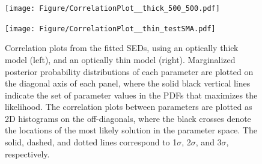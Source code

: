 \documentclass[twocolumn,apj,numberedappendix]{emulateapj}
\begin{document}

\begin{figure}[!tbph]
\centering
\begin{minipage}{0.5\textwidth}
\hspace{-1cm}
\texttt{[image: Figure/CorrelationPlot\_\_thick\_500\_500.pdf]}
\end{minipage}
\hspace{-0.9cm}
\begin{minipage}{0.5\textwidth}
\texttt{[image: Figure/CorrelationPlot\_\_thin\_testSMA.pdf]}
\end{minipage}
\caption{Correlation plots from the fitted SEDs, using an optically thick
model (left), and an optically thin model (right). Marginalized posterior probability
distributions of each
parameter are plotted on the diagonal axis of each panel, where the solid black vertical lines indicate the set of parameter values in the PDFs that maximizes the likelihood. The correlation plots between parameters are plotted as 2D histograms on the off-diagonals, where the black crosses denote the
locations of the most likely solution in the parameter space. The solid, dashed, and dotted lines correspond to 1$\sigma$, 2$\sigma$, and $3\sigma$, respectively. 
\label{fig:sedlikelihood}}
\end{figure}
\end{document}
